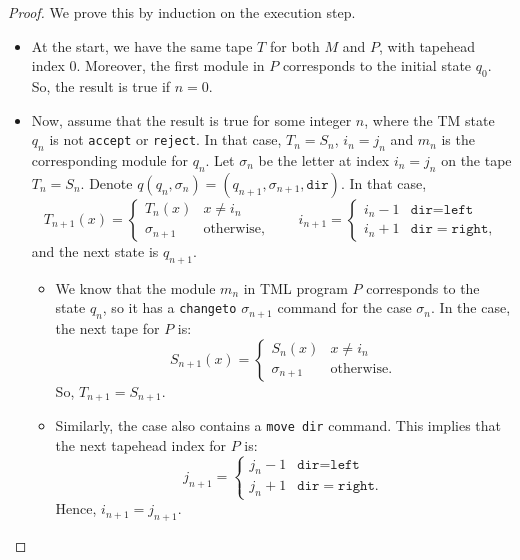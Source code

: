 \documentclass{article}
\begin{document}
    \begin{proof}
        We prove this by induction on the execution step. 
        \begin{itemize}
            \item At the start, we have the same tape $T$ for both $M$ and $P$, with tapehead index $0$. Moreover, the first module in $P$ corresponds to the initial state $q_0$. So, the result is true if $n = 0$.
            
            \item Now, assume that the result is true for some integer $n$, where the TM state $q_n$ is not \texttt{accept} or \texttt{reject}. In that case, $T_n = S_n$, $i_n = j_n$ and $m_n$ is the corresponding module for $q_n$. Let $\sigma_n$ be the letter at index $i_n = j_n$ on the tape $T_n = S_n$. Denote $q(q_n, \sigma_n) = (q_{n+1}, \sigma_{n+1}, \texttt{dir})$. In that case,
            \[T_{n+1}(x) = \begin{cases}
                T_n(x) & x \neq i_n \\
                \sigma_{n+1} & \text{otherwise},
            \end{cases} \qquad i_{n+1} = \begin{cases}
                i_n - 1 & \texttt{dir} = \texttt{left} \\
                i_n + 1 & \texttt{dir} = \texttt{right},
            \end{cases}\]
            and the next state is $q_{n+1}$. 
            
            \begin{itemize}
                \item We know that the module $m_n$ in TML program $P$ corresponds to the state $q_n$, so it has a \texttt{changeto} $\sigma_{n+1}$ command for the case $\sigma_n$. In the case, the next tape for $P$ is:
                \[S_{n+1}(x) = \begin{cases}
                    S_n(x) & x \neq i_n \\
                    \sigma_{n+1} & \text{otherwise}.
                \end{cases}\]
                So, $T_{n+1} = S_{n+1}$. 
                
                \item Similarly, the case also contains a \texttt{move dir} command. This implies that the next tapehead index for $P$ is:
                \[j_{n+1} = \begin{cases}
                    j_n - 1 & \texttt{dir} = \texttt{left} \\
                    j_n + 1 & \texttt{dir} = \texttt{right}.
                \end{cases}\]
                Hence, $i_{n+1} = j_{n+1}$. 
            

\end{itemize}
\end{itemize}
\end{proof}
\end{document}
